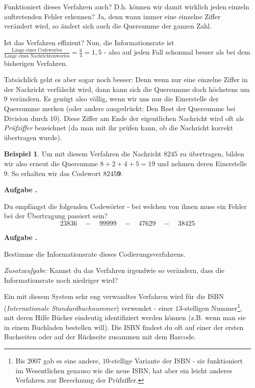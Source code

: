 \documentclass[a4paper,ngerman,12pt]{scrartcl}
\theoremstyle{definition}
\newtheorem{bsp}[defn]{Beispiel}
\theoremstyle{plain}
\theoremstyle{remark}
\newlength{\aufgabenskip}
\newcounter{aufgabennummer}
\newenvironment{aufgabe}[1]{
	\addtocounter{aufgabennummer}{1}
	\textbf{Aufgabe \theaufgabennummer.} \emph{#1} \par
}{\vspace{\aufgabenskip}}
\begin{document}
Funktioniert dieses Verfahren auch? D.h. können wir damit wirklich jeden einzeln auftretenden Fehler erkennen? Ja, denn wann immer eine einzelne Ziffer verändert wird, so ändert sich auch die Quersumme der ganzen Zahl. 

Ist das Verfahren effizient? Nun, die Informationsrate ist $\frac{\text{Länge eines Codewortes}}{\text{Länge eines Nachrichtenwortes}} = \frac{6}{4} = 1,5$ - also auf jeden Fall schonmal besser als bei dem bisherigen Verfahren.

Tatsächlich geht es aber sogar noch besser: Denn wenn nur eine einzelne Ziffer in der Nachricht verfälscht wird, dann kann sich die Quersumme doch höchstens um $9$ verändern. Es genügt also völlig, wenn wir uns nur die Einerstelle der Quersumme merken (oder anders ausgedrückt: Den Rest der Quersumme bei Division durch $10$). Diese Ziffer am Ende der eigentlichen Nachricht wird oft als \emph{Prüfziffer} bezeichnet (da man mit ihr prüfen kann, ob die Nachricht korrekt übertragen wurde).

\begin{bsp}
	Um mit diesem Verfahren die Nachricht $8245$ zu übertragen, bilden wir also erneut die Quersumme $8+2+4+5=19$ und nehmen deren Einerstelle $9$. So erhalten wir das Codewort $8245\textbf{9}$.
\end{bsp}

\begin{aufgabe}{}
	Du empfängst die folgenden Codewörter - bei welchen von ihnen muss ein Fehler bei der Übertragung passiert sein?
		\[23836 \quad-\quad 99999 \quad-\quad 47629 \quad-\quad 38425\]
\end{aufgabe}

\begin{aufgabe}{}
	Bestimme die Informationsrate dieses Codierungsverfahrens.

	\emph{Zusatzaufgabe:} Kannst du das Verfahren irgendwie so verändern, dass die Informationsrate noch niedriger wird?
\end{aufgabe}


Ein mit diesem System sehr eng verwandtes Verfahren wird für die ISBN (\emph{Internationale Standardbuchnummer}) verwendet - einer $13$-stelligen Nummer\footnote{Bis 2007 gab es eine andere, $10$-stellige Variante der ISBN - sie funktioniert im Wesentlichen genauso wie die neue ISBN, hat aber ein leicht anderes Verfahren zur Berechnung der Prüfziffer.}, mit deren Hilfe Bücher eindeutig identifiziert werden können (z.B. wenn man sie in einem Buchladen bestellen will). Die ISBN findest du oft auf einer der ersten Buchseiten oder auf der Rückseite zusammen mit dem Barcode.
\end{document}
